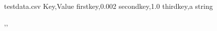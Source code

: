 \documentclass{etk-article}
\begin{document}
\begin{filecontents}{testdata.csv}
	Key,Value
	firstkey,0.002
	secondkey,1.0
	thirdkey,a string
\end{filecontents}	
	
\mapfirstkey,\mapsecondkey,\mapthirdkey\\
\end{document}
